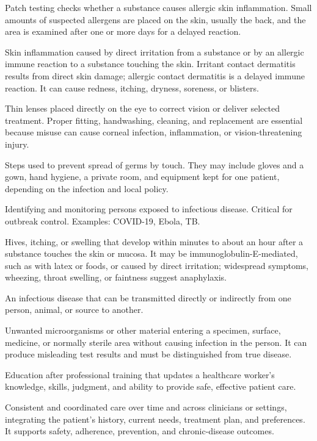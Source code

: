 Patch testing checks whether a substance causes allergic skin inflammation. Small amounts of suspected allergens are placed on the skin, usually the back, and the area is examined after one or more days for a delayed reaction.

 Skin inflammation caused by direct irritation from a substance or by an allergic immune reaction to a substance touching the skin. Irritant contact dermatitis results from direct skin damage; allergic contact dermatitis is a delayed immune reaction. It can cause redness, itching, dryness, soreness, or blisters.

 Thin lenses placed directly on the eye to correct vision or deliver selected treatment. Proper fitting, handwashing, cleaning, and replacement are essential because misuse can cause corneal infection, inflammation, or vision-threatening injury.

 Steps used to prevent spread of germs by touch. They may include gloves and a gown, hand hygiene, a private room, and equipment kept for one patient, depending on the infection and local policy.

 Identifying and monitoring persons exposed to infectious disease. Critical for outbreak
control. Examples: COVID-19, Ebola, TB.

 Hives, itching, or swelling that develop within minutes to about an hour after a substance touches the skin or mucosa. It may be immunoglobulin-E-mediated, such as with latex or foods, or caused by direct irritation; widespread symptoms, wheezing, throat swelling, or faintness suggest anaphylaxis.

 An infectious disease that can be transmitted directly or indirectly from one person,
animal, or source to another.

 Unwanted microorganisms or other material entering a specimen, surface, medicine, or normally sterile area without causing infection in the person. It can produce misleading test results and must be distinguished from true disease.

 Education after professional training that updates a healthcare worker's knowledge, skills, judgment, and ability to provide safe, effective patient care.

 Consistent and coordinated care over time and across clinicians or settings, integrating
the patient’s history, current needs, treatment plan, and preferences. It supports
safety, adherence, prevention, and chronic-disease outcomes.

